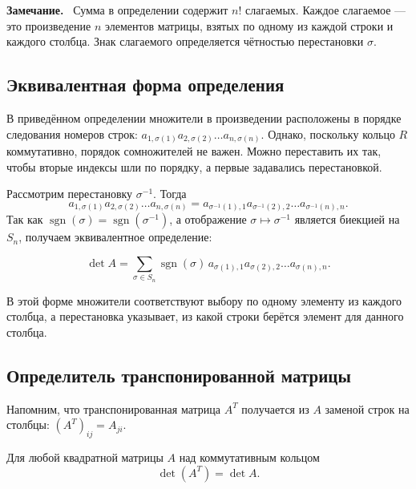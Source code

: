 \documentclass[a4paper,12pt]{article}
\newcommand{\myremark}{\textbf{Замечание.}\ }
\theoremstyle{definition}
\theoremstyle{plain}
\theoremstyle{remark}
\begin{document}
	\myremark
	Сумма в определении содержит \( n! \) слагаемых. Каждое слагаемое — это произведение \( n \) элементов матрицы, взятых по одному из каждой строки и каждого столбца. Знак слагаемого определяется чётностью перестановки \( \sigma \).
	
	\subsection{Эквивалентная форма определения}
	
	В приведённом определении множители в произведении расположены в порядке следования номеров строк: \( a_{1,\sigma(1)} a_{2,\sigma(2)} \dots a_{n,\sigma(n)} \). Однако, поскольку кольцо \( R \) коммутативно, порядок сомножителей не важен. Можно переставить их так, чтобы вторые индексы шли по порядку, а первые задавались перестановкой.
	
	Рассмотрим перестановку \( \sigma^{-1} \). Тогда
	\[
	a_{1,\sigma(1)} a_{2,\sigma(2)} \dots a_{n,\sigma(n)} = a_{\sigma^{-1}(1),1} a_{\sigma^{-1}(2),2} \dots a_{\sigma^{-1}(n),n}.
	\]
	Так как \( \operatorname{sgn}(\sigma) = \operatorname{sgn}(\sigma^{-1}) \), а отображение \( \sigma \mapsto \sigma^{-1} \) является биекцией на \( S_n \), получаем эквивалентное определение:
	
	\begin{tcolorbox}[colback=green!5, colframe=green!50!black, title=Эквивалентная форма]
		\[
		\det A = \sum_{\sigma \in S_n} \operatorname{sgn}(\sigma) \, a_{\sigma(1),1} a_{\sigma(2),2} \dots a_{\sigma(n),n}.
		\]
	\end{tcolorbox}
	
	В этой форме множители соответствуют выбору по одному элементу из каждого столбца, а перестановка указывает, из какой строки берётся элемент для данного столбца.
	
	\subsection{Определитель транспонированной матрицы}
	
	Напомним, что транспонированная матрица \( A^T \) получается из \( A \) заменой строк на столбцы: \( (A^T)_{ij} = A_{ji} \).
	
	\begin{tcolorbox}[colback=red!5, colframe=red!50!black, title=Теорема]
		Для любой квадратной матрицы \( A \) над коммутативным кольцом
		\[
		\det(A^T) = \det A.
		\]
	\end{tcolorbox}
	
\end{document}
